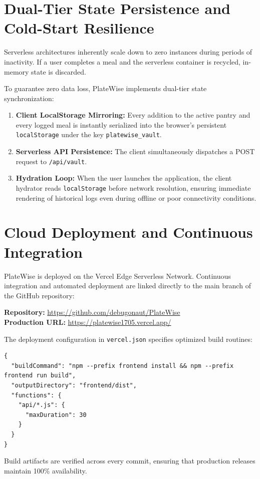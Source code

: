 \section{Dual-Tier State Persistence and Cold-Start Resilience}
Serverless architectures inherently scale down to zero instances during periods of inactivity. If a user completes a meal and the serverless container is recycled, in-memory state is discarded.

To guarantee zero data loss, PlateWise implements dual-tier state synchronization:
\begin{enumerate}
    \item \textbf{Client LocalStorage Mirroring:} Every addition to the active pantry and every logged meal is instantly serialized into the browser's persistent \texttt{localStorage} under the key \texttt{platewise\_vault}.
    \item \textbf{Serverless API Persistence:} The client simultaneously dispatches a POST request to \texttt{/api/vault}.
    \item \textbf{Hydration Loop:} When the user launches the application, the client hydrator reads \texttt{localStorage} before network resolution, ensuring immediate rendering of historical logs even during offline or poor connectivity conditions.
\end{enumerate}

\section{Cloud Deployment and Continuous Integration}
PlateWise is deployed on the Vercel Edge Serverless Network. Continuous integration and automated deployment are linked directly to the main branch of the GitHub repository:
\begin{center}
\textbf{Repository:} \url{https://github.com/debugonaut/PlateWise} \\
\textbf{Production URL:} \url{https://platewise1705.vercel.app/}
\end{center}
The deployment configuration in \texttt{vercel.json} specifies optimized build routines:
\begin{lstlisting}
{
  "buildCommand": "npm --prefix frontend install && npm --prefix frontend run build",
  "outputDirectory": "frontend/dist",
  "functions": {
    "api/*.js": {
      "maxDuration": 30
    }
  }
}
\end{lstlisting}
Build artifacts are verified across every commit, ensuring that production releases maintain 100\% availability.
